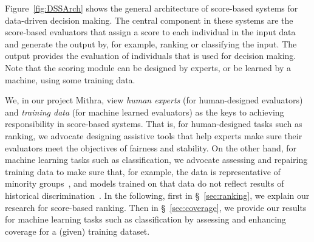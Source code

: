 Figure~\ref{fig:DSSArch} shows the general architecture of score-based systems for data-driven decision making.
The central component in these systems are the score-based evaluators that assign a score to each individual in the input data and generate the output by, for example, ranking or classifying the input. The output provides the evaluation of individuals that is used for decision making. %
Note that 
the scoring module can be designed by experts, or be learned by a machine, using some training data.

We, in our project Mithra, view \textit{human experts} (for human-designed evaluators) and \textit{training data} (for machine learned evaluators) as the keys to achieving responsibility in score-based systems.
That is, for human-designed tasks such as ranking, we advocate designing assistive tools that help experts make sure their evaluators meet the objectives of fairness and stability. On the other hand, for machine learning tasks such as classification, we advocate assessing and repairing training data to make sure that, for example,  the data is representative of minority groups~\cite{asudeh2019designing}, and models trained on that data do not reflect results of historical discrimination~\cite{salimi2019capuchin2}.
In the following, first in \S~\ref{sec:ranking}, we explain our research for score-based ranking. Then in \S~\ref{sec:coverage}, we provide our results for machine learning tasks such as classification by assessing and enhancing coverage for a (given) training dataset.





